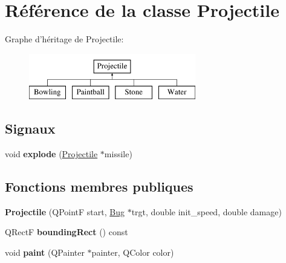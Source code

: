 \hypertarget{classProjectile}{
\section{Référence de la classe Projectile}
\label{classProjectile}
}
Graphe d'héritage de Projectile:\begin{figure}[H]
\begin{center}
\leavevmode
\includegraphics[height=2.000000cm]{classProjectile}
\end{center}
\end{figure}
\subsection*{Signaux}
\begin{DoxyCompactItemize}
\item 
\hypertarget{classProjectile_a18d1fccd74f92b54f239c13c74cbc00c}{
void {\bfseries explode} (\hyperlink{classProjectile}{Projectile} $\ast$missile)}
\label{classProjectile_a18d1fccd74f92b54f239c13c74cbc00c}

\end{DoxyCompactItemize}
\subsection*{Fonctions membres publiques}
\begin{DoxyCompactItemize}
\item 
\hypertarget{classProjectile_adb1e35e75922feb87c3391f549d3274f}{
{\bfseries Projectile} (QPointF start, \hyperlink{classBug}{Bug} $\ast$trgt, double init\_\-speed, double damage)}
\label{classProjectile_adb1e35e75922feb87c3391f549d3274f}

\item 
\hypertarget{classProjectile_a0e0b18909c9c154404384707c6515802}{
QRectF {\bfseries boundingRect} () const }
\label{classProjectile_a0e0b18909c9c154404384707c6515802}

\item 
\hypertarget{classProjectile_aef0d6ffcea7620988cf5446d0c1133fa}{
void {\bfseries paint} (QPainter $\ast$painter, QColor color)}
\label{classProjectile_aef0d6ffcea7620988cf5446d0c1133fa}

\end{DoxyCompactItemize}

